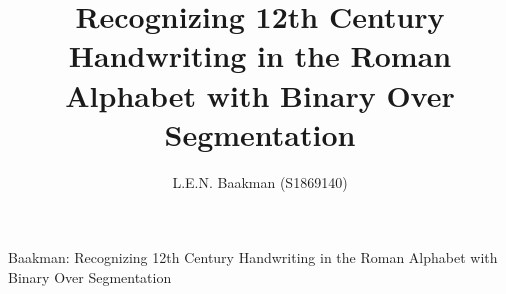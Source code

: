 \title{Recognizing 12th Century Handwriting in the Roman Alphabet with Binary Over Segmentation}
\author{L.E.N. Baakman (S1869140)}

%
{Baakman: Recognizing 12th Century Handwriting in the Roman Alphabet with Binary Over Segmentation}